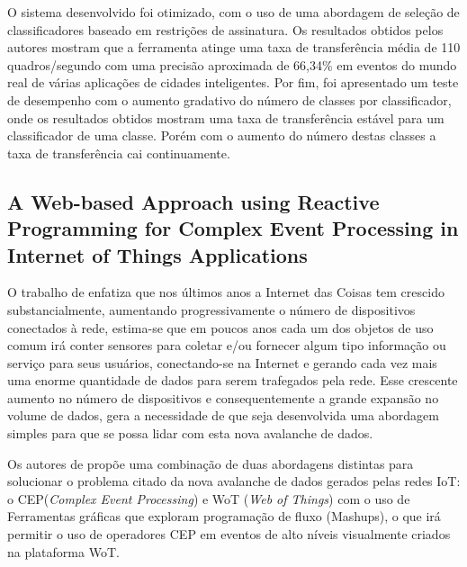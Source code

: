 \documentclass[ti,table]{texufpel} %
\begin{document}
     

     O sistema desenvolvido foi otimizado, com o uso de uma abordagem de seleção de classificadores baseado em restrições de assinatura. Os resultados obtidos pelos autores mostram que a ferramenta atinge uma taxa de transferência média de 110 quadros/segundo com uma precisão aproximada de 66,34\% em eventos do mundo real de várias aplicações de cidades inteligentes. Por fim, foi apresentado um teste de desempenho com o aumento gradativo do número de classes por classificador, onde os resultados obtidos mostram uma taxa de transferência estável para um classificador de uma classe. Porém com o aumento do número destas classes a taxa de transferência cai continuamente.   

     

  

  

  

\subsection{A Web-based Approach using Reactive Programming for Complex Event Processing in Internet of Things Applications}     

     

    O trabalho de \cite{art2zimmerle2018web} enfatiza que nos últimos anos a Internet das Coisas tem crescido substancialmente, aumentando progressivamente o número de dispositivos conectados à rede, estima-se que em poucos anos cada um dos objetos de uso comum irá conter sensores para coletar e/ou fornecer algum tipo informação ou serviço para seus usuários, conectando-se na Internet e gerando cada vez mais uma enorme quantidade de dados para serem trafegados pela rede. Esse crescente aumento no número de dispositivos e consequentemente a grande expansão no volume de dados, gera a necessidade de que seja desenvolvida uma abordagem simples para que se possa lidar com esta nova avalanche de dados. 

     

    Os autores de \cite{art2zimmerle2018web} propõe uma combinação de duas abordagens distintas para solucionar o problema citado da nova avalanche de dados gerados pelas redes IoT: o CEP(\textit{Complex Event Processing}) e WoT (\textit{Web of Things}) com o uso de Ferramentas gráficas que exploram programação de fluxo (Mashups), o que irá permitir o uso de operadores CEP em eventos de alto níveis visualmente criados na plataforma WoT. 
\end{document}
